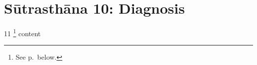 \chapter{Sūtrasthāna 10: Diagnosis}
\label{kṣārapāka}

\begin{translation}
    \label{visikhapravesaniyam}
    
    
    \item[11]
    \footnote{See p.\,\pageref{kṣārapāka2} below.}
    content
\end{translation}
